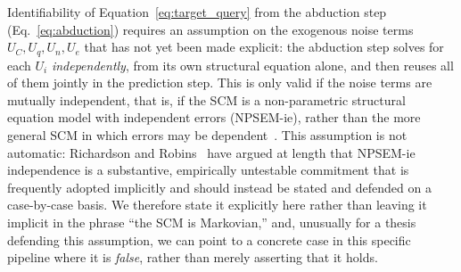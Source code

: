 \documentclass[11pt,a4paper]{report}
\begin{document}
Identifiability of Equation~\eqref{eq:target_query} from the abduction step (Eq.~\ref{eq:abduction}) requires an assumption on the exogenous noise terms $U_C, U_q, U_n, U_e$ that has not yet been made explicit: the abduction step solves for each $U_i$ \emph{independently}, from its own structural equation alone, and then reuses all of them jointly in the prediction step. This is only valid if the noise terms are mutually independent, that is, if the SCM is a non-parametric structural equation model with independent errors (NPSEM-ie), rather than the more general SCM in which errors may be dependent~\cite{vonk2023disentangling}. This assumption is not automatic: Richardson and Robins~\cite{richardsonrobins2013} have argued at length that NPSEM-ie independence is a substantive, empirically untestable commitment that is frequently adopted implicitly and should instead be stated and defended on a case-by-case basis. We therefore state it explicitly here rather than leaving it implicit in the phrase ``the SCM is Markovian,'' and, unusually for a thesis defending this assumption, we can point to a concrete case in this specific pipeline where it is \emph{false}, rather than merely asserting that it holds.
\end{document}
